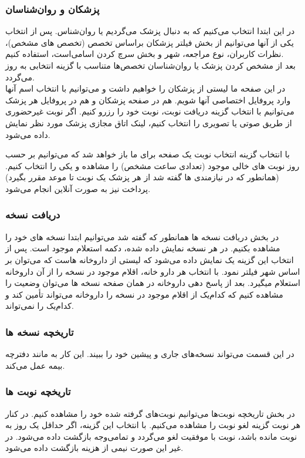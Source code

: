 \documentclass[a4paper]{article}
\begin{document}
		\subsubsection{پزشکان و روان‌شناسان}
		در این ابتدا انتخاب می‌کنیم که به دنبال پزشک می‌گردیم یا روان‌شناس. پس از انتخاب یکی از آنها می‌توانیم از بخش فیلتر پزشکان براساس تخصص (تخصص های مشخص)، نظرات کاربران، نوع مراجعه، شهر و بخش سرچ کردن اسامی‌است، استفاده کنیم.\\
		بعد از مشخص کردن پزشک یا روان‌شناسان تخصص‌ها متناسب با گزینه انتخابی به روز می‌گردد.\\
			در این صفحه ما لیستی از پزشکان را خواهیم داشت و می‌توانیم با انتخاب اسم آنها وارد پروفایل اختصاصی آنها شویم.
			هم در صفحه پزشکان و هم در پروفایل هر پزشک می‌توانیم با انتخاب گزینه دریافت نوبت، نوبت خود را رزرو کنیم. اگر نوبت غیرحضوری از طریق صوتی یا تصویری را انتخاب کنیم، لینک اتاق مجازی پزشک مورد نظر نمایش داده می‌شود.
			
			با انتخاب گزینه انتخاب نوبت یک صفحه  برای ما باز خواهد شد که می‌توانیم بر حسب روز نوبت های خالی موجود (تعدادی ساعت مشخص) را مشاهده و یکی را انتخاب کنیم. (همانطور که در نیازمندی ها گفته شد از هر پزشک یک نوبت تا موعد مقرر بگیرد)
			پرداخت نیز به صورت آنلاین انجام می‌شود.
			
		\subsubsection{دریافت نسخه}
			در بخش دریافت نسخه ها همانطور که گفته شد می‌توانیم ابتدا نسخه های خود را مشاهده بکنیم.
			در هر نسخه نمایش داده شده، دکمه استعلام موجود است. پس از انتخاب این گزینه یک  نمایش داده می‌شود که لیستی از داروخانه هاست که می‌توان بر اساس شهر فیلتر نمود. با انتخاب هر دارو خانه، اقلام موجود در نسخه را از آن داروخانه استعلام میگیرد.
			بعد از پاسخ دهی داروخانه در همان صفحه نسخه ها می‌توان وضعیت را مشاهده کنیم که کدام‌یک از اقلام موجود در نسخه را داروخانه می‌تواند تأمین کند و کدام‌یک را نمی‌تواند.
		\subsubsection{تاریخچه نسخه ها}
			در این قسمت می‌تواند نسخه‌های جاری و پیشین خود را ببیند. این کار به مانند دفترچه بیمه عمل می‌کند.
		\subsubsection{تاریخچه نوبت ها}
			در بخش تاریخچه نوبت‌ها می‌توانیم نوبت‌های گرفته شده خود را مشاهده کنیم. در کنار هر نوبت گزینه لغو نوبت را مشاهده می‌کنیم. با انتخاب این گزینه، اگر حداقل یک روز به نوبت مانده باشد، نوبت با موفقیت لغو می‌گردد و تمامی‌وجه بازگشت داده می‌شود. در غیر این صورت نیمی ‌از هزینه بازگشت داده می‌شود.
\end{document}
